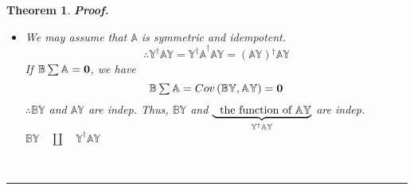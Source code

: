 \documentclass{article}
\newtheorem{theorem}{Theorem}
\newenvironment{proof}[1][Proof]{\noindent\textbf{#1.} }{\ \rule{0.5em}{0.5em}}
\begin{document}
\begin{theorem}
\begin{proof}
\begin{itemize}
\begin{eqnarray*}
{{_{1}^{\dagger }\mathbb{P}}} \\
&=&\mathbb{B}%
\tsum\mkern-20mu\tsum%
\mathbb{\mathbb{P}}_{1}\underset{I_{r}}{\underbrace{\mathbb{D}_{1}\mathbb{D}%
_{1}^{-1}}} \\
&=&\mathbb{B}%
\tsum\mkern-20mu\tsum%
\mathbb{\mathbb{P}}_{1}
\end{eqnarray*}%
\newline
Thus, $Cov\left( \mathbb{BY},\mathbb{P}_{1}^{\dagger }\mathbb{Y}\right) =%
\mathbb{B}%
\tsum\mkern-20mu\tsum%
\mathbb{\mathbb{P}}_{1}=\boldsymbol{0}$\newline
\newline
$\therefore \mathbb{P}^{\dagger }\mathbb{Y}$ and $\mathbb{BY}$ are
independent%
\begin{equation*}
\mathbb{Y^{\dagger }AY}=\left( \mathbb{P}_{1}^{\dagger }\mathbb{Y}\right) 
\mathbb{D}_{1}\left( \mathbb{P}_{1}^{\dagger }\mathbb{Y}\right) \text{ is a
function of }\mathbb{P}_{1}^{\dagger }\mathbb{Y}
\end{equation*}%
\newline
$\therefore \mathbb{Y^{\dagger }AY}$ and $\mathbb{BY}$ are independent%
\newline
\newline

\item[Case 2] We may assume that $\mathbb{A}$ is symmetric and idempotent.%
\begin{equation*}
\therefore \mathbb{Y^{\dagger }AY=Y^{\dagger }A}^{\dagger }\mathbb{AY}%
=\left( \mathbb{AY}\right) \mathbb{^{\dagger }AY}
\end{equation*}%
\newline
\newline
If $\mathbb{B}\mathop{\textstyle \sum } \mathbb{A}=\boldsymbol{0}$, we have%
\begin{equation*}
\mathbb{B}\tsum \mathbb{A}=Cov\left( \mathbb{BY},\mathbb{AY}\right) =%
\boldsymbol{0}
\end{equation*}%
$\therefore \mathbb{BY}$ and $\mathbb{AY}$ are indep.\newline
\newline
Thus, $\mathbb{BY}$ and $\underset{\mathbb{Y^{\dagger }AY}}{\underbrace{%
\text{the function of }\mathbb{AY}}}$ are indep.\newline
\newline
$\mathbb{BY\quad \amalg \quad Y^{\dagger }AY}$
\end{itemize}
\end{proof}
\end{theorem}
\end{document}

